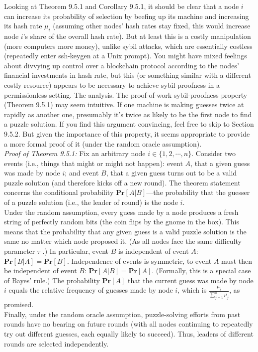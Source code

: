 Looking at Theorem 9.5.1 and Corollary 9.5.1, it should be clear that a node $i$ can increase
its probability of selection by beefing up its machine and increasing its hash rate $\mu_i$ (assuming
other nodes’ hash rates stay fixed, this would increase node $i$’s share of the overall hash rate).
But at least this is a costly manipulation (more computers \Rightarrow more money), unlike sybil
attacks, which are essentially costless (repeatedly enter ssh-keygen at a Unix prompt). You
might have mixed feelings about divvying up control over a blockchain protocol according to
the nodes’ financial investments in hash rate, but this (or something similar with a different
costly resource) appears to be necessary to achieve sybil-proofness in a permissionless setting.
The analysis. The proof-of-work sybil-proofness property (Theorem 9.5.1) may seem intuitive.
If one machine is making guesses twice at rapidly as another one, presumably it’s twice as
likely to be the first node to find a puzzle solution. If you find this argument convincing, feel
free to skip to Section 9.5.2. But given the importance of this property, it seems appropriate
to provide a more formal proof of it (under the random oracle assumption).\\

\noindent
\textit{Proof of Theorem 9.5.1:} Fix an arbitrary node $i \in \{1, 2, \cdots, n\}$. Consider two events (i.e.,
things that might or might not happen): event $A$, that a given guess was made by node $i$;
and event $B$, that a given guess turns out to be a valid puzzle solution (and therefore kicks off a new round). The theorem statement concerns the conditional probability $\textbf{Pr}[A|B]$—the probability that the guesser of a puzzle solution (i.e., the leader of round) is the node $i$.\\
Under the random assumption, every guess made by a node produces a fresh
string of perfectly random bits (the coin flips by the gnome in the box). This means that the
probability that any given guess is a valid puzzle solution is the same no matter which node
proposed it. (As all nodes face the same difficulty parameter $\tau$ .) In particular, event $B$ is
independent of event $A$: $\textbf{Pr}[B|A] = \textbf{Pr}[B]$. Independence of events is symmetric, to event $A$
must then be independent of event $B$: $\textbf{Pr}[A|B] = \textbf{Pr}[A]$. (Formally, this is a special case of
Bayes’ rule.) The probability $\textbf{Pr}[A]$ that the current guess was made by node $i$ equals the
relative frequency of guesses made by node $i$, which is $\frac{\mu_i}{\sum_{j=1}^n \mu_j}$, as promised.\\
Finally, under the random oracle assumption, puzzle-solving efforts from past rounds have
no bearing on future rounds (with all nodes continuing to repeatedly try out different guesses,
each equally likely to succeed). Thus, leaders of different rounds are selected independently.

